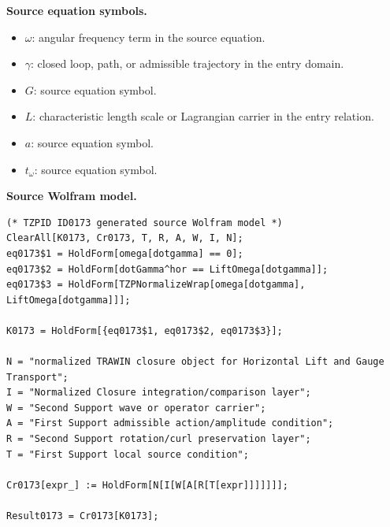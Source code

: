 \begin{minipage}[t]{0.49\linewidth}
\begingroup
\small
\raggedright
\textbf{Source equation symbols.}\par
\begin{itemize}[leftmargin=1.35em,itemsep=1pt,topsep=1pt,parsep=0pt]
    \item $\omega$: angular frequency term in the source equation.
    \item $\gamma$: closed loop, path, or admissible trajectory in the entry domain.
    \item $G$: source equation symbol.
    \item $L$: characteristic length scale or Lagrangian carrier in the entry relation.
    \item $a$: source equation symbol.
    \item $t_{\omega}$: source equation symbol.
\end{itemize}
\endgroup
\end{minipage}\hfill
\begin{minipage}[t]{0.47\linewidth}
\begingroup
\scriptsize
\raggedright
\textbf{Source Wolfram model.}\par
\begin{Verbatim}[fontsize=\tiny,breaklines=true,breakanywhere=true]
(* TZPID ID0173 generated source Wolfram model *)
ClearAll[K0173, Cr0173, T, R, A, W, I, N];
eq0173$1 = HoldForm[omega[dotgamma] == 0];
eq0173$2 = HoldForm[dotGamma^hor == LiftOmega[dotgamma]];
eq0173$3 = HoldForm[TZPNormalizeWrap[omega[dotgamma], LiftOmega[dotgamma]]];

K0173 = HoldForm[{eq0173$1, eq0173$2, eq0173$3}];

N = "normalized TRAWIN closure object for Horizontal Lift and Gauge Transport";
I = "Normalized Closure integration/comparison layer";
W = "Second Support wave or operator carrier";
A = "First Support admissible action/amplitude condition";
R = "Second Support rotation/curl preservation layer";
T = "First Support local source condition";

Cr0173[expr_] := HoldForm[N[I[W[A[R[T[expr]]]]]]];

Result0173 = Cr0173[K0173];
\end{Verbatim}
\endgroup
\end{minipage}

